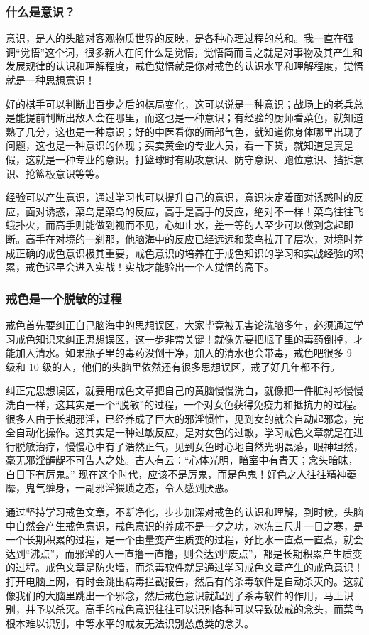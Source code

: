 \subsubsection{什么是意识？}

意识，是人的头脑对客观物质世界的反映，是各种心理过程的总和。我一直在强调“觉悟”这个词，很多新人在问什么是觉悟，觉悟简而言之就是对事物及其产生和发展规律的认识和理解程度，戒色觉悟就是你对戒色的认识水平和理解程度，觉悟就是一种思想意识！

好的棋手可以判断出百步之后的棋局变化，这可以说是一种意识；战场上的老兵总是能提前判断出敌人会在哪里，而这也是一种意识；有经验的厨师看菜色，就知道熟了几分，这也是一种意识；好的中医看你的面部气色，就知道你身体哪里出现了问题，这也是一种意识的体现；买卖黄金的专业人员，看一下货，就知道是真是假，这就是一种专业的意识。打篮球时有助攻意识、防守意识、跑位意识、挡拆意识、抢篮板意识等等。

经验可以产生意识，通过学习也可以提升自己的意识，意识决定着面对诱惑时的反应，面对诱惑，菜鸟是菜鸟的反应，高手是高手的反应，绝对不一样！菜鸟往往飞蛾扑火，而高手则能做到视而不见，心如止水，差一等的人至少可以做到念起即断。高手在对境的一刹那，他脑海中的反应已经远远和菜鸟拉开了层次，对境时养成正确的戒色意识极其重要，戒色意识的培养在于戒色知识的学习和实战经验的积累，戒色迟早会进入实战！实战才能验出一个人觉悟的高下。

\subsubsection{戒色是一个脱敏的过程}

戒色首先要纠正自己脑海中的思想误区，大家毕竟被无害论洗脑多年，必须通过学习戒色知识来纠正思想误区，这一步非常关键！就像先要把瓶子里的毒药倒掉，才能加入清水。如果瓶子里的毒药没倒干净，加入的清水也会带毒，戒色吧很多 9 级和 10 级的人，他们的头脑里依然还有很多思想误区，戒了好几年都不行。

纠正完思想误区，就要用戒色文章把自己的黄脑慢慢洗白，就像把一件脏衬衫慢慢洗白一样，这其实是一个“脱敏”的过程，一个对女色获得免疫力和抵抗力的过程。很多人由于长期邪淫，已经养成了巨大的邪淫惯性，见到女的就会自动起邪念，完全自动化操作。这其实是一种过敏反应，是对女色的过敏，学习戒色文章就是在进行脱敏治疗，慢慢心中有了浩然正气，见到女色时心地自然光明磊落，眼神坦然，毫无邪淫龌龊不可告人之处。古人有云：“心体光明，暗室中有青天；念头暗昧，白日下有厉鬼。” 现在这个时代，应该不是厉鬼，而是色鬼！好色之人往往精神萎靡，鬼气缠身，一副邪淫猥琐之态，令人感到厌恶。

通过坚持学习戒色文章，不断净化，步步加深对戒色的认识和理解，到时候，头脑中自然会产生戒色意识，戒色意识的养成不是一夕之功，冰冻三尺非一日之寒，是一个长期积累的过程，是一个由量变产生质变的过程，好比水一直煮一直煮，就会达到“沸点”，而邪淫的人一直撸一直撸，则会达到“废点”，都是长期积累产生质变的过程。戒色文章是防火墙，而杀毒软件就是通过学习戒色文章产生的戒色意识！打开电脑上网，有时会跳出病毒拦截报告，然后有的杀毒软件是自动杀灭的。这就像我们的大脑里跳出一个邪念，然后戒色意识就起到了杀毒软件的作用，马上识别，并予以杀灭。高手的戒色意识往往可以识别各种可以导致破戒的念头，而菜鸟根本难以识别，中等水平的戒友无法识别怂恿类的念头。

